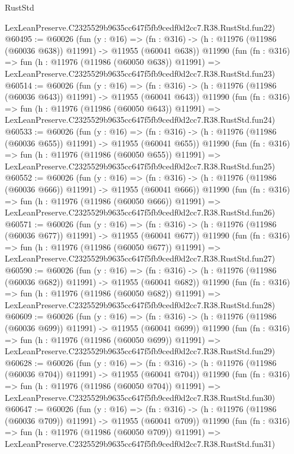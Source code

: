 \begin{lexlean}{RustStd}
\begin{coremodule}
    LexLeanPreserve.C2325529b9635cc647f5fb9cedf0d2cc7.R38.RustStd.fun22)
@60495 := @60026
    (fun (y : @16) =>
    (fn : @316) -> (h : @11976 (@11986 (@60036 @638)) @11991) -> @11955 (@60041 @638))
    @11990
    (fun (fn : @316) =>
    fun (h : @11976 (@11986 (@60050 @638)) @11991) =>
    LexLeanPreserve.C2325529b9635cc647f5fb9cedf0d2cc7.R38.RustStd.fun23)
@60514 := @60026
    (fun (y : @16) =>
    (fn : @316) -> (h : @11976 (@11986 (@60036 @643)) @11991) -> @11955 (@60041 @643))
    @11990
    (fun (fn : @316) =>
    fun (h : @11976 (@11986 (@60050 @643)) @11991) =>
    LexLeanPreserve.C2325529b9635cc647f5fb9cedf0d2cc7.R38.RustStd.fun24)
@60533 := @60026
    (fun (y : @16) =>
    (fn : @316) -> (h : @11976 (@11986 (@60036 @655)) @11991) -> @11955 (@60041 @655))
    @11990
    (fun (fn : @316) =>
    fun (h : @11976 (@11986 (@60050 @655)) @11991) =>
    LexLeanPreserve.C2325529b9635cc647f5fb9cedf0d2cc7.R38.RustStd.fun25)
@60552 := @60026
    (fun (y : @16) =>
    (fn : @316) -> (h : @11976 (@11986 (@60036 @666)) @11991) -> @11955 (@60041 @666))
    @11990
    (fun (fn : @316) =>
    fun (h : @11976 (@11986 (@60050 @666)) @11991) =>
    LexLeanPreserve.C2325529b9635cc647f5fb9cedf0d2cc7.R38.RustStd.fun26)
@60571 := @60026
    (fun (y : @16) =>
    (fn : @316) -> (h : @11976 (@11986 (@60036 @677)) @11991) -> @11955 (@60041 @677))
    @11990
    (fun (fn : @316) =>
    fun (h : @11976 (@11986 (@60050 @677)) @11991) =>
    LexLeanPreserve.C2325529b9635cc647f5fb9cedf0d2cc7.R38.RustStd.fun27)
@60590 := @60026
    (fun (y : @16) =>
    (fn : @316) -> (h : @11976 (@11986 (@60036 @682)) @11991) -> @11955 (@60041 @682))
    @11990
    (fun (fn : @316) =>
    fun (h : @11976 (@11986 (@60050 @682)) @11991) =>
    LexLeanPreserve.C2325529b9635cc647f5fb9cedf0d2cc7.R38.RustStd.fun28)
@60609 := @60026
    (fun (y : @16) =>
    (fn : @316) -> (h : @11976 (@11986 (@60036 @699)) @11991) -> @11955 (@60041 @699))
    @11990
    (fun (fn : @316) =>
    fun (h : @11976 (@11986 (@60050 @699)) @11991) =>
    LexLeanPreserve.C2325529b9635cc647f5fb9cedf0d2cc7.R38.RustStd.fun29)
@60628 := @60026
    (fun (y : @16) =>
    (fn : @316) -> (h : @11976 (@11986 (@60036 @704)) @11991) -> @11955 (@60041 @704))
    @11990
    (fun (fn : @316) =>
    fun (h : @11976 (@11986 (@60050 @704)) @11991) =>
    LexLeanPreserve.C2325529b9635cc647f5fb9cedf0d2cc7.R38.RustStd.fun30)
@60647 := @60026
    (fun (y : @16) =>
    (fn : @316) -> (h : @11976 (@11986 (@60036 @709)) @11991) -> @11955 (@60041 @709))
    @11990
    (fun (fn : @316) =>
    fun (h : @11976 (@11986 (@60050 @709)) @11991) =>
    LexLeanPreserve.C2325529b9635cc647f5fb9cedf0d2cc7.R38.RustStd.fun31)

\end{coremodule}
\end{lexlean}
